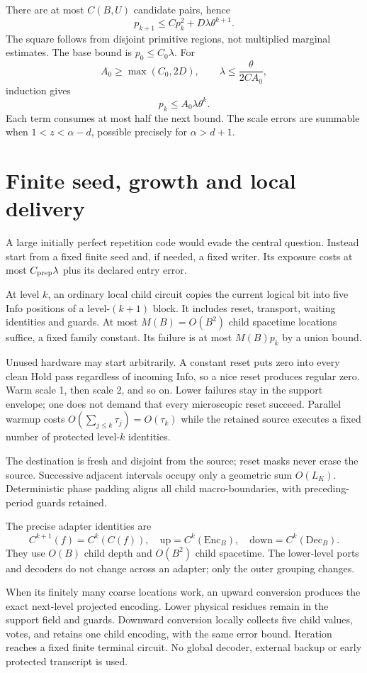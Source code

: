 \documentclass[11pt,a4paper]{article}
\begin{document}
There are at most $C(B,U)$ candidate pairs, hence
\[
 p_{k+1}\le Cp_k^2+D\lambda\theta^{k+1}.
\]
The square follows from disjoint primitive regions, not multiplied marginal estimates. The base bound is $p_0\le C_0\lambda$. For
\[
 A_0\ge\max(C_0,2D),\qquad \lambda\le\frac{\theta}{2CA_0},
\]
induction gives
\[
 \boxed{p_k\le A_0\lambda\theta^k.}
\]
Each term consumes at most half the next bound. The scale errors are summable when $1<z<\alpha-d$, possible precisely for $\alpha>d+1$.

\section{Finite seed, growth and local delivery}
A large initially perfect repetition code would evade the central question. Instead start from a fixed finite seed and, if needed, a fixed writer. Its exposure costs at most $C_{\rm prep}\lambda$ plus its declared entry error.

At level $k$, an ordinary local child circuit copies the current logical bit into five Info positions of a level-$(k+1)$ block. It includes reset, transport, waiting identities and guards. At most $M(B)=O(B^2)$ child spacetime locations suffice, a fixed family constant. Its failure is at most $M(B)p_k$ by a union bound.

Unused hardware may start arbitrarily. A constant reset puts zero into every clean Hold pass regardless of incoming Info, so a nice reset produces regular zero. Warm scale 1, then scale 2, and so on. Lower failures stay in the support envelope; one does not demand that every microscopic reset succeed. Parallel warmup costs $O(\sum_{j\le k}\tau_j)=O(\tau_k)$ while the retained source executes a fixed number of protected level-$k$ identities.

The destination is fresh and disjoint from the source; reset masks never erase the source. Successive adjacent intervals occupy only a geometric sum $O(L_K)$. Deterministic phase padding aligns all child macro-boundaries, with preceding-period guards retained.

The precise adapter identities are
\[
 C^{k+1}(f)=C^k(C(f)),\quad
 \mathrm{up}=C^k(\mathrm{Enc}_B),\quad
 \mathrm{down}=C^k(\mathrm{Dec}_B).
\]
They use $O(B)$ child depth and $O(B^2)$ child spacetime. The lower-level ports and decoders do not change across an adapter; only the outer grouping changes.

When its finitely many coarse locations work, an upward conversion produces the exact next-level projected encoding. Lower physical residues remain in the support field and guards. Downward conversion locally collects five child values, votes, and retains one child encoding, with the same error bound. Iteration reaches a fixed finite terminal circuit. No global decoder, external backup or early protected transcript is used.
\end{document}
